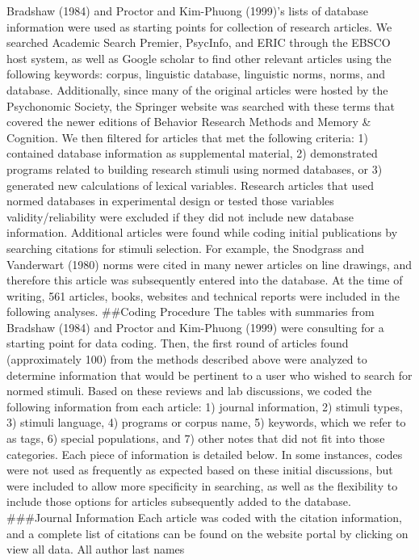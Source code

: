 \documentclass[english,man]{apa6}
\theoremstyle{definition}
\theoremstyle{definition}
\theoremstyle{definition}
\theoremstyle{remark}
\begin{document}
Bradshaw (1984) and Proctor and Kim-Phuong (1999)'s lists of database
information were used as starting points for collection of research
articles. We searched Academic Search Premier, PsycInfo, and ERIC
through the EBSCO host system, as well as Google scholar to find other
relevant articles using the following keywords: corpus, linguistic
database, linguistic norms, norms, and database. Additionally, since
many of the original articles were hosted by the Psychonomic Society,
the Springer website was searched with these terms that covered the
newer editions of Behavior Research Methods and Memory \& Cognition. We
then filtered for articles that met the following criteria: 1) contained
database information as supplemental material, 2) demonstrated programs
related to building research stimuli using normed databases, or 3)
generated new calculations of lexical variables. Research articles that
used normed databases in experimental design or tested those variables
validity/reliability were excluded if they did not include new database
information. Additional articles were found while coding initial
publications by searching citations for stimuli selection. For example,
the Snodgrass and Vanderwart (1980) norms were cited in many newer
articles on line drawings, and therefore this article was subsequently
entered into the database. At the time of writing, 561 articles, books,
websites and technical reports were included in the following analyses.
\#\#Coding Procedure The tables with summaries from Bradshaw (1984) and
Proctor and Kim-Phuong (1999) were consulting for a starting point for
data coding. Then, the first round of articles found (approximately 100)
from the methods described above were analyzed to determine information
that would be pertinent to a user who wished to search for normed
stimuli. Based on these reviews and lab discussions, we coded the
following information from each article: 1) journal information, 2)
stimuli types, 3) stimuli language, 4) programs or corpus name, 5)
keywords, which we refer to as tags, 6) special populations, and 7)
other notes that did not fit into those categories. Each piece of
information is detailed below. In some instances, codes were not used as
frequently as expected based on these initial discussions, but were
included to allow more specificity in searching, as well as the
flexibility to include those options for articles subsequently added to
the database. \#\#\#Journal Information Each article was coded with the
citation information, and a complete list of citations can be found on
the website portal by clicking on view all data. All author last names
\end{document}
